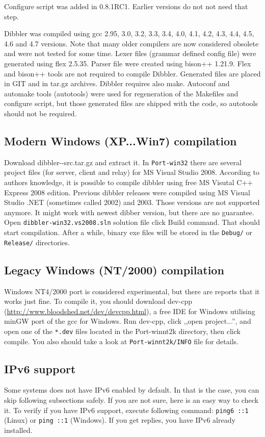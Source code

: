 Configure script was added in 0.8.1RC1. Earlier versions do not not
need that step.

Dibbler was compiled using gcc 2.95, 3.0, 3.2, 3.3, 3.4, 4.0, 4.1,
4.2, 4.3, 4.4, 4.5, 4.6 and 4.7 versions. Note that many older compilers are
now considered obsolete and were not tested for some time. Lexer files
(grammar defined config file) were generated using flex 2.5.35. Parser
file were created using bison++ 1.21.9. Flex and bison++ tools are not
required to compile Dibbler. Generated files are placed in GIT and in
tar.gz archives. Dibbler requires also make. Autoconf and automake
tools (autotools) were used for regeneration of the Makefiles and
configure script, but those generated files are shipped with the code,
so autotools should not be required.

\subsection{Modern Windows (XP...Win7) compilation}
Download dibbler-\version-src.tar.gz and extract it. In
\verb+Port-win32+ there are several project files (for server, client
and relay) for MS Visual Studio 2008. According to authors knowledge,
it is possible to compile dibbler using free MS Visutal C++ Express
2008 edition. Previous dibbler releases were compiled using MS Visual
Studio .NET (sometimes called 2002) and 2003. Those versions are not
supported anymore. It might work with newest dibber version, but there
are no guarantee. Open \verb+dibbler-win32.vs2008.sln+ solution file
click Build command. That should start compilation. After a while,
binary exe files will be stored in the \verb+Debug/+ or
\verb+Release/+ directories.

\subsection{Legacy Windows (NT/2000) compilation}
Windows NT4/2000 port is considered experimental, but there are reports
that it works just fine. To compile it, you should download dev-cpp
(\url{http://www.bloodshed.net/dev/devcpp.html}), a free IDE for
Windows utilising minGW port of the gcc for Windows. Run dev-cpp,
click ,,open project...'', and open one of the \verb+*.dev+ files located
in the Port-winnt2k directory, then click compile. You also should
take a look at \verb+Port-winnt2k/INFO+ file for details.


\subsection{IPv6 support}
Some systems does not have IPv6 enabled by default. In that is the case,
you can skip following subsections safely. If you are not sure, here is
an easy way to check it. To verify if you have IPv6 support, execute
following command: \verb+ping6 ::1+ (Linux) or \verb+ping ::1+
(Windows). If you get replies, you have IPv6 already installed.

